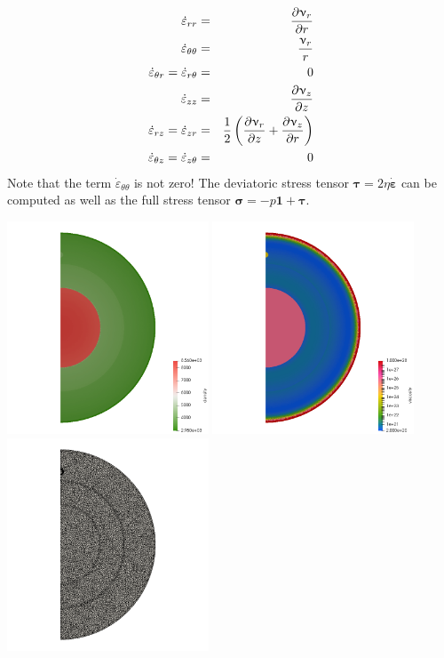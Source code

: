 \begin{eqnarray}
\dot\varepsilon_{rr} 
&=& \frac{\partial \upnu_r}{\partial r} \nonumber\\
\dot\varepsilon_{\theta\theta}  &=& \frac{\upnu_r}{r} \nonumber\\
\dot\varepsilon_{\theta r} = \dot\varepsilon_{r\theta}  &=& 0 \nonumber\\
\dot\varepsilon_{zz} &=& \frac{\partial \upnu_z}{\partial z} \nonumber\\
\dot{\varepsilon}_{rz} = \dot{\varepsilon}_{zr} 
&=& \frac{1}{2}\left( \frac{\partial \upnu_r}{\partial z} + \frac{\partial \upnu_z}{\partial r} \right) \nonumber\\
\dot{\varepsilon}_{\theta z} = \dot{\varepsilon}_{z \theta} &=& 0 \nonumber
\end{eqnarray}
Note that the term $\dot\varepsilon_{\theta\theta} $ is not zero!
The deviatoric stress tensor ${\bm \tau}=2\eta \dot{\bm \varepsilon}$ can be computed
as well as the full stress tensor ${\bm \sigma}=-p {\bm 1} + {\bm \tau}$. 

\begin{center}
\includegraphics[width=6cm]{python_codes/fieldstone_96/images/rho}
\includegraphics[width=6cm]{python_codes/fieldstone_96/images/eta}
\includegraphics[width=6cm]{python_codes/fieldstone_96/images/mesh}
\end{center}

